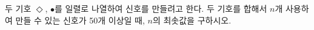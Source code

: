 두 기호 $\Diamond$, $\bullet$를 일렬로 나열하여 신호를 만들려고 한다. 두 기호를 합해서 $n$개 사용하여 만들 수 있는 신호가 50개 이상일 때, $n$의 최솟값을 구하시오.
